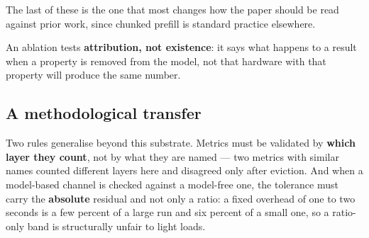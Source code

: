 The last of these is the one that most changes how the paper should be read against prior work, since chunked prefill is standard practice elsewhere.

An ablation tests \textbf{attribution, not existence}: it says what happens to a result when a property is removed from the model, not that hardware with that property will produce the same number.

\subsection{A methodological transfer}

Two rules generalise beyond this substrate. Metrics must be validated by \textbf{which layer they count}, not by what they are named --- two metrics with similar names counted different layers here and disagreed only after eviction. And when a model-based channel is checked against a model-free one, the tolerance must carry the \textbf{absolute} residual and not only a ratio: a fixed overhead of one to two seconds is a few percent of a large run and six percent of a small one, so a ratio-only band is structurally unfair to light loads.
